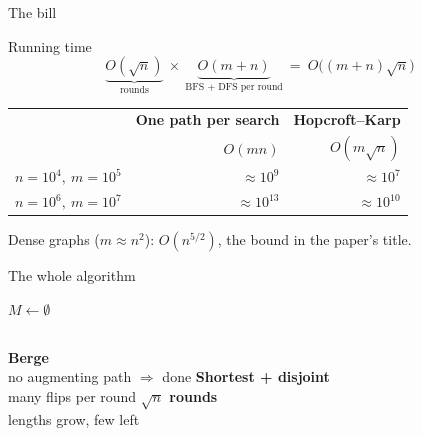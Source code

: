 \documentclass[aspectratio=169,11pt]{beamer}
\begin{document}
\begin{frame}{The bill}
\begin{block}{Running time}
\[
  \underbrace{O(\sqrt n)}_{\text{rounds}}\ \times\ \underbrace{O(m+n)}_{\text{BFS + DFS per round}}\ =\ O\big((m+n)\sqrt n\big)
\]
\end{block}
\vspace{2mm}
\centering
\begin{tabular}{lrr}
\toprule
 & \textbf{One path per search} & \textbf{Hopcroft--Karp}\\
 & $O(mn)$ & $O(m\sqrt n)$\\
\midrule
$n=10^4,\ m=10^5$ & $\approx10^9$ & $\approx10^7$\\
$n=10^6,\ m=10^7$ & $\approx10^{13}$ & $\approx10^{10}$\\
\bottomrule
\end{tabular}
\vspace{3mm}

{\small Dense graphs ($m\approx n^2$): $O(n^{5/2})$, the bound in the paper's title.}
\end{frame}

\begin{frame}{The whole algorithm}
\begin{algorithm}[H]
\Large
$M\gets\emptyset$\;
\end{algorithm}
\vspace{2mm}
\begin{columns}[T]
\centering\textbf{Berge}\\ \small no augmenting path $\Rightarrow$ done
\centering\textbf{Shortest + disjoint}\\ \small many flips per round
\centering\textbf{$\sqrt n$ rounds}\\ \small lengths grow, few left
\end{columns}
\end{frame}
\end{document}
